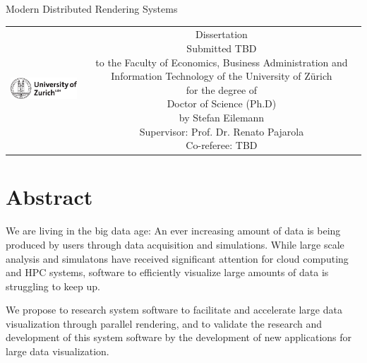 
\usepackage{pbox}
\usepackage{tabularx}
\usepackage{wrapfig}
\usepackage{csvsimple}
\usepackage{paralist}
\usepackage{csquotes}

\newcommand{\fix}[1]{\textbf{\color{red}{#1}}}
\newcommand{\fig}[1]{Figure~\ref{#1}}
\newcommand{\sref}[1]{Section~\ref{#1}}
\newcommand{\aref}[1]{Appendix~\ref{#1}}


\begin{titlepage}
\begin{center}
\sffamily
\null\vspace{2cm}
{\huge Modern Distributed Rendering Systems\par}
\vfill
\begin{tabular}{cc}
\parbox{0.4\textwidth}{\includegraphics[width=5cm]{images/uzh}}
&
\parbox{0.6\textwidth}{%
        Dissertation\\
        Submitted TBD\\[9pt]
        to the Faculty of Economics, Business Administration and Information Technology of the University of Z\"urich\\[9pt]
        for the degree of\\
        Doctor of Science (Ph.D)\\[9pt]
        by Stefan Eilemann\\[9pt]
        Supervisor: Prof. Dr. Renato Pajarola\\
        Co-referee: TBD}
\end{tabular}
\end{center}
\vspace{2cm}
\end{titlepage}
\setcounter{page}{0}

\section*{Abstract}
We are living in the big data age: An ever increasing amount of data is being
produced by users through data acquisition and simulations. While large scale
analysis and simulatons have received significant attention for cloud computing
and HPC systems, software to efficiently visualize large amounts of data is
struggling to keep up.

We propose to research system software to facilitate and accelerate large data
visualization through parallel rendering, and to validate the research and
development of this system software by the development of new applications for
large data visualization.

